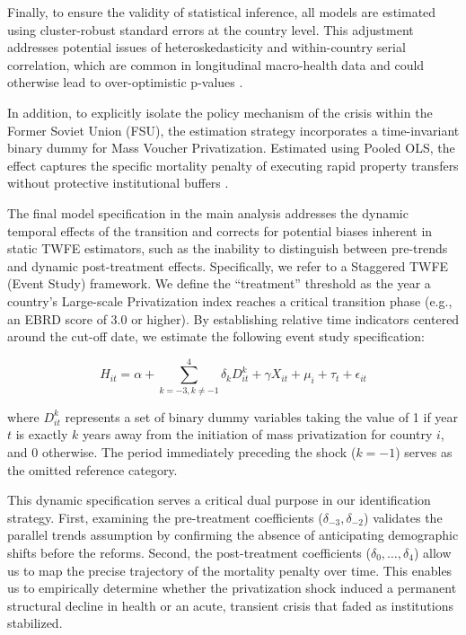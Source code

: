 \documentclass[en,magisterska]{pracamgr}
\begin{document}
Finally, to ensure the validity of statistical inference, all models are estimated using cluster-robust standard errors at the country level. This adjustment addresses potential issues of heteroskedasticity 
and within-country serial correlation, which are common in longitudinal macro-health data and could otherwise lead to over-optimistic p-values \citep{Gerry2012, CameronMiller2015, Bertrand2004}.

In addition, to explicitly isolate the policy mechanism of the crisis within the Former Soviet Union (FSU), the estimation strategy incorporates a time-invariant binary dummy for Mass Voucher Privatization. Estimated using Pooled OLS, the effect captures the specific mortality penalty of executing rapid property transfers without protective institutional buffers \citep{Hamm2012}.

The final model specification in the main analysis addresses the dynamic temporal effects of the transition and corrects for potential biases inherent in static TWFE estimators, such as the inability to distinguish between pre-trends and dynamic 
post-treatment effects. Specifically, we refer to a Staggered TWFE (Event Study) framework. We define the ``treatment'' threshold as the year a country's Large-scale Privatization index reaches 
a critical transition phase (e.g., an EBRD score of 3.0 or higher). By establishing relative time indicators centered around the cut-off date, we estimate the following event study specification:

$$H_{it} = \alpha + \sum_{k=-3, k \neq -1}^{4} \delta_k D_{it}^k + \gamma X_{it} + \mu_i + \tau_t + \epsilon_{it}$$

where $D_{it}^k$ represents a set of binary dummy variables taking the value of 1 if year $t$ is exactly $k$ years away from the initiation of mass privatization for country $i$, and 0 otherwise. 
The period immediately preceding the shock ($k = -1$) serves as the omitted reference category. 

This dynamic specification serves a critical dual purpose in our identification strategy. First, examining the pre-treatment coefficients ($\delta_{-3}, \delta_{-2}$) validates the parallel trends 
assumption by confirming the absence of anticipating demographic shifts before the reforms. Second, the post-treatment coefficients ($\delta_{0}, \dots, \delta_{4}$) allow us to map the precise trajectory 
of the mortality penalty over time. This enables us to empirically determine whether the privatization shock induced a permanent structural decline in health or an acute, transient crisis that faded as 
institutions stabilized.
\end{document}
